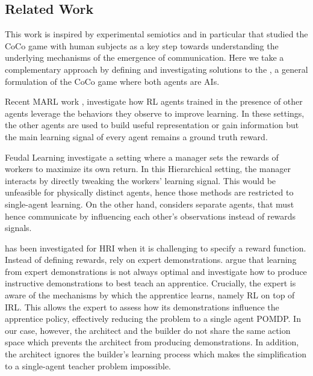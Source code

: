 \subsection{Related Work}
This work is inspired by experimental semiotics \citep{galantucci2011experimental} and in particular \citep{vollmer2014studying} that studied the CoCo game with human subjects as a key step towards understanding the underlying mechanisms of the emergence of communication. Here we take a complementary approach by defining and investigating solutions to the \abp, a general formulation of the CoCo game where both agents are AIs. 

Recent MARL work \citep{lowe2017multi,woodward2020learning, roy2020promoting, ndousse2021emergent}, investigate how RL agents trained in the presence of other agents leverage the behaviors they observe to improve learning. In these settings, the other agents are used to build useful representation or gain information but the main learning signal of every agent remains a ground truth reward. 

Feudal Learning \citep{dayan1992feudal, kulkarni2016hierarchical, vezhnevets2017feudal, nachum2018data,  ahilan2019feudal} investigate a setting where a manager sets the rewards of workers to maximize its own return. In this Hierarchical setting, the manager interacts by directly tweaking the workers' learning signal. This would be unfeasible for physically distinct agents, hence those methods are restricted to single-agent learning. On the other hand, \abp considers separate agents, that must hence communicate by influencing each other's observations instead of rewards signals. 

\irl has been investigated for HRI when it is challenging to specify a reward function. Instead of defining rewards, \irl rely on expert demonstrations. \citet{hadfield2016cooperative} argue that learning from expert demonstrations is not always optimal and investigate how to produce instructive demonstrations to best teach an apprentice. Crucially, the expert is aware of the mechanisms by which the apprentice learns, namely RL on top of IRL. This allows the expert to assess how its demonstrations influence the apprentice policy, effectively reducing the problem to a single agent POMDP. In our case, however, the architect and the builder do not share the same action space which prevents the architect from producing demonstrations. In addition, the architect ignores the builder's learning process which makes the simplification to a single-agent teacher problem impossible. 

